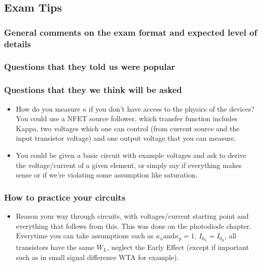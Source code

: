 \subsection{Exam Tips}
\subsubsection{General comments on the exam format and expected level of details}
\subsubsection{Questions that they told us were popular}
\subsubsection{Questions that they we think will be asked}
\begin{itemize}
    \item How do you measure $\kappa$ if you don't have access to the physics of the devices? \\
    You could use a NFET source follower, which transfer function includes Kappa, two voltages which one can control (from current source and the input transistor voltage) and one output voltage that you can measure. 
    \item You could be given a basic circuit with example voltages and ask to derive the voltage/current of a given element, or simply say if everything makes sense or if we're violating some assumption like saturation.
\end{itemize}
\subsubsection{How to practice your circuits}
\begin{itemize}
    \item Reason your way through circuits, with voltages/current starting point and everything that follows from this. This was done on the photodiode chapter. Everytime you can take assumptions such as $\kappa_n \mathrm{and} \kappa_p = 1$, $I_{0_n} = I_{0_p}$, all transistors have the same $W_L$, neglect the Early Effect (except if important such as in small signal difference WTA for example).  
\end{itemize}

